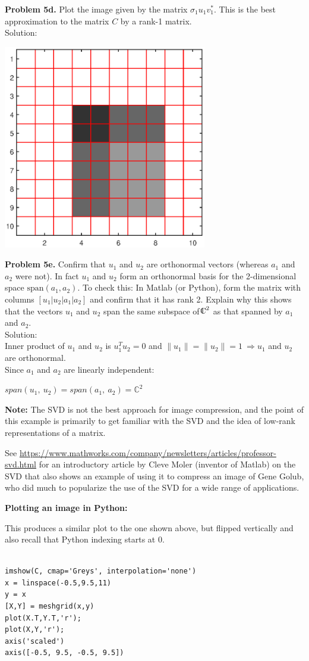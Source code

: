 \documentclass[10pt]{article}
\begin{document}
{\bf Problem 5d.} Plot the image given by the matrix $\sigma_1 u_1v_1^*$.  This is
the best approximation to the matrix $C$ by a rank-1 matrix.\\
Solution:\\
\centerline{\includegraphics[width=3.5in]{5d.eps}}

{\bf Problem 5e.} Confirm that $u_1$ and $u_2$ are orthonormal vectors
(whereas $a_1$ and $a_2$ were not).  In fact $u_1$ and $u_2$ form an
orthonormal basis for the 2-dimensional space $\text{span}(a_1,a_2)$.
To check this: In Matlab (or Python), form the matrix
with columns $[u_1 | u_2 | a_1 | a_2]$ and confirm that it has rank 2.
Explain why this shows that the vectors $u_1$ and $u_2$ span the same
subspace of $\complex^2$ as that spanned by $a_1$ and $a_2$.\\

Solution:\\
Inner product of $u_1$ and $u_2$ is $u_1^Tu_2 = 0$ and $\parallel u_1\parallel = \parallel u_2\parallel = 1 ~ \Rightarrow u_1$ and $u_2$ are orthonormal.\\
Since $a_1$ and $a_2$ are linearly independent:\\
\centerline {$span(u_1,~u_2) = span(a_1,~a_2) = \mathbb {C}^2$}

\vskip 5pt
{\bf Note:} The SVD is not the best approach for image compression,
and the point of this example is primarily to get familiar with the
SVD and the idea of low-rank representations of a matrix.

See
\url{https://www.mathworks.com/company/newsletters/articles/professor-svd.html}
for an introductory article by Cleve Moler (inventor of Matlab) on
the SVD that also shows an example of using it to compress an image
of Gene Golub, who did much to popularize the use of the SVD for a
wide range of applications.

\vskip 1cm
{\bf Plotting an image in Python:}

This produces a similar plot to the one shown above, but flipped vertically
and also recall that Python indexing starts at 0.

\begin{verbatim}

imshow(C, cmap='Greys', interpolation='none')
x = linspace(-0.5,9.5,11)
y = x
[X,Y] = meshgrid(x,y)
plot(X.T,Y.T,'r');
plot(X,Y,'r');
axis('scaled')
axis([-0.5, 9.5, -0.5, 9.5])
\end{verbatim}
\end{document}

